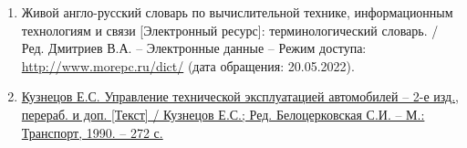 \begin{enumerate}
	\item
		Живой англо-русский словарь по вычислительной технике,
		информационным технологиям и связи [Электронный ресурс]: терминологический
		словарь. / Ред. Дмитриев В.А. --
		Электронные данные --
		Режим доступа:
		\url{http://www.morepc.ru/dict/}
		(дата обращения: 20.05.2022).%
		\label{ref:календарное-планирование}

	\item
		\href{http://rusautomobile.ru/wp-content/uploads/dop_materials/books/03.12.2015/6/KuznetsovESUpravlenietehnicheskojekspluatatsiejavtomobilej(MTransport1990).pdf}%
		{Кузнецов Е.С. Управление технической эксплуатацией автомобилей --
		2-е изд., перераб. и доп. [Текст] / Кузнецов Е.С.; Ред. Белоцерковская
		С.И. -- М.: Транспорт, 1990. -- 272 с.}%
		\label{ref:кузнецов}
		\label{ref:last}






\end{enumerate}
